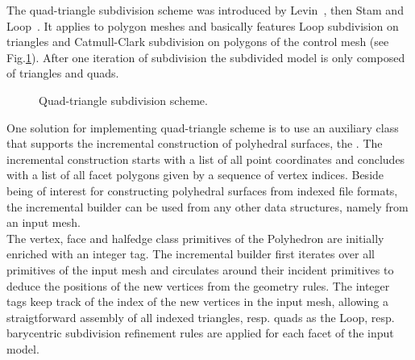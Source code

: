 
The quad-triangle subdivision scheme was introduced by
Levin~\cite{l-pg-03}, then Stam and Loop~\cite{qts}. It applies to
polygon meshes and basically features Loop subdivision on triangles
and Catmull-Clark subdivision on polygons of the control mesh (see
Fig.\ref{fig:quad-triangle}). After one iteration of subdivision the
subdivided model is only composed of triangles and quads.

\begin{figure}
    \caption{Quad-triangle subdivision scheme.}
    \label{fig:quad-triangle}
\end{figure}

One solution for implementing quad-triangle scheme is to use an
auxiliary class that supports the incremental construction of
polyhedral surfaces, the . The incremental
construction starts with a list of all point coordinates and concludes
with a list of all facet polygons given by a sequence of vertex
indices.  Beside being of interest for constructing polyhedral
surfaces from indexed file formats, the incremental builder can be
used from any other data structures, namely from an input mesh.\\

The vertex, face and halfedge class primitives of the Polyhedron are
initially enriched with an integer tag. The incremental builder first
iterates over all primitives of the input mesh and circulates around
their incident primitives to deduce the positions of the new vertices
from the geometry rules. The integer tags keep track of the index of
the new vertices in the input mesh, allowing a straigtforward assembly
of all indexed triangles, resp. quads as the Loop, resp. barycentric
subdivision refinement rules are applied for each facet of the input
model.

